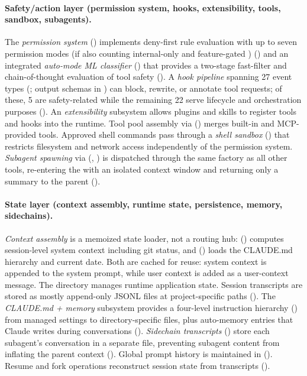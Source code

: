 \paragraph{Safety/action layer (permission system, hooks, extensibility, tools, sandbox, subagents).}
The \emph{permission system} () implements deny-first rule evaluation with up to seven permission modes (if also counting internal-only  and feature-gated ) () and an integrated \emph{auto-mode ML classifier} () that provides a two-stage fast-filter and chain-of-thought evaluation of tool safety (). A \emph{hook pipeline} spanning 27 event types (; output schemas in ) can block, rewrite, or annotate tool requests; of these, 5 are safety-related while the remaining 22 serve lifecycle and orchestration purposes (). An \emph{extensibility} subsystem allows plugins and skills to register tools and hooks into the runtime. Tool pool assembly via  () merges built-in and MCP-provided tools. Approved shell commands pass through a \emph{shell sandbox} () that restricts filesystem and network access independently of the permission system. \emph{Subagent spawning} via  (, ) is dispatched through the same  factory as all other tools, re-entering the  with an isolated context window and returning only a summary to the parent ().

\paragraph{State layer (context assembly, runtime state, persistence, memory, sidechains).}
\emph{Context assembly} is a memoized state loader, not a routing hub:  () computes session-level system context including git status, and  () loads the CLAUDE.md hierarchy and current date. Both are cached for reuse: system context is appended to the system prompt, while user context is added as a user-context message. The  directory manages runtime application state. Session transcripts are stored as mostly append-only JSONL files at project-specific paths (). The \emph{CLAUDE.md + memory} subsystem provides a four-level instruction hierarchy () from managed settings to directory-specific files, plus auto-memory entries that Claude writes during conversations (). \emph{Sidechain transcripts} () store each subagent's conversation in a separate file, preventing subagent content from inflating the parent context (). Global prompt history is maintained in  (). Resume and fork operations reconstruct session state from transcripts ().

